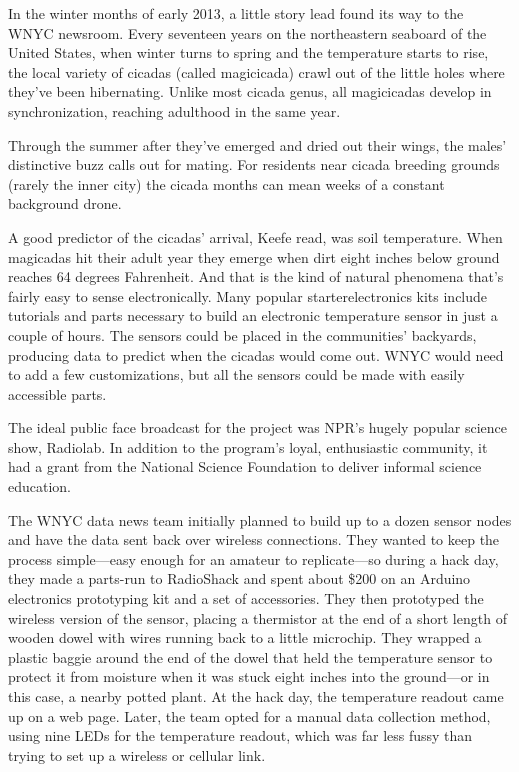 In the winter months of early 2013, a little story lead found its way to the
WNYC newsroom. Every seventeen years on the northeastern seaboard of
the United States, when winter turns to spring and the temperature starts
to rise, the local variety of cicadas (called magicicada) crawl out of the little
holes where they've been hibernating. Unlike most cicada genus, all magicicadas
develop in synchronization, reaching adulthood in the same year.

Through the summer after they've emerged and dried out their wings, the
males' distinctive buzz calls out for mating. For residents near cicada breeding
grounds (rarely the inner city) the cicada months can mean weeks of a
constant background drone.

A good predictor of the cicadas' arrival, Keefe read, was soil temperature.
When magicadas hit their adult year they emerge when dirt eight inches
below ground reaches 64 degrees Fahrenheit. And that is the kind of natural
phenomena that's fairly easy to sense electronically. Many popular starterelectronics
kits include tutorials and parts necessary to build an electronic
temperature sensor in just a couple of hours. The sensors could be placed
in the communities' backyards, producing data to predict when the cicadas
would come out. WNYC would need to add a few customizations, but all
the sensors could be made with easily accessible parts.

The ideal public face broadcast for the project was NPR's hugely popular
science show, Radiolab. In addition to the program's loyal, enthusiastic
community, it had a grant from the National Science Foundation to deliver
informal science education.

The WNYC data news team initially planned to build up to a dozen sensor
nodes and have the data sent back over wireless connections. They wanted
to keep the process simple—easy enough for an amateur to replicate—so
during a hack day, they made a parts-run to RadioShack and spent about
\$200 on an Arduino electronics prototyping kit and a set of accessories.
They then prototyped the wireless version of the sensor, placing a thermistor
at the end of a short length of wooden dowel with wires running back
to a little microchip. They wrapped a plastic baggie around the end of the
dowel that held the temperature sensor to protect it from moisture when
it was stuck eight inches into the ground—or in this case, a nearby potted
plant. At the hack day, the temperature readout came up on a web page.
Later, the team opted for a manual data collection method, using nine LEDs
for the temperature readout, which was far less fussy than trying to set up a
wireless or cellular link.

